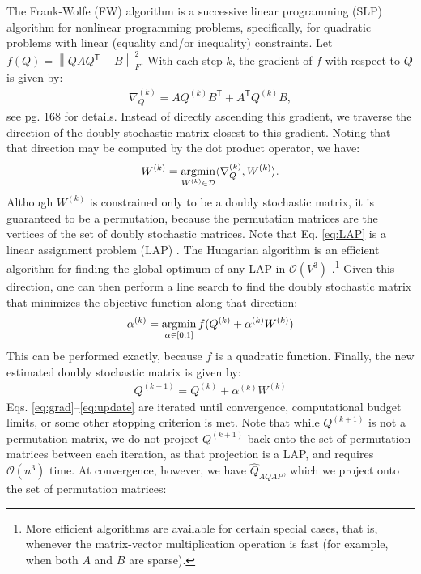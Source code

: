 \documentclass{article} %
\providecommand{\norm}[1]{\left \lVert#1 \right  \rVert}
\newcommand{\argmin}{\operatornamewithlimits{argmin}}
\newcommand{\T}{^{\ensuremath{\mathsf{T}}}}           %
\providecommand{\mc}[1]{\mathcal{#1}}
\providecommand{\mh}[1]{\hat{#1}}
\begin{document}
The Frank-Wolfe (FW) algorithm is a successive linear programming (SLP) \cite{} algorithm for nonlinear programming problems, specifically, for quadratic problems with linear (equality and/or inequality) constraints. Let $f(Q)=\norm{QAQ\T-B}_F^2$.  With each step $k$, the gradient of $f$ with respect to $Q$ is given by:
\begin{align} \label{eq:grad}
	\nabla_Q^{(k)} = A Q^{(k)} B\T + A\T Q^{(k)} B, 
\end{align}
see \cite{MDS} pg. 168 for details. Instead of directly ascending this gradient, we traverse the direction of the doubly stochastic matrix closest to this gradient. Noting that that direction may be computed by the dot product operator, we have:
\begin{align}\label{eq:LAP}
	W^{(k)} = \argmin_{W^{(k)} \in \mc{D}} \langle \nabla_Q^{(k)},W^{(k)} \rangle. %
\end{align}
Although $W^{(k)}$ is constrained only to be a doubly stochastic matrix, it is guaranteed to be a permutation, because the permutation matrices are the vertices of the set of doubly stochastic matrices.  Note that Eq. \eqref{eq:LAP} is a linear assignment problem (LAP) \cite{}.  The Hungarian algorithm is an efficient algorithm for finding the global optimum of any LAP in $\mc{O}(V^3)$ \cite{}.\footnote{More efficient algorithms are available for certain special cases, that is, whenever the matrix-vector multiplication operation is fast (for example, when both $A$ and $B$ are sparse).} Given this direction, one can then perform a line search to find the doubly stochastic matrix that minimizes the objective function along that direction:
\begin{align}
	\alpha^{(k)} = \argmin_{\alpha \in [0,1]} f(Q^{(k)} + \alpha^{(k)} W^{(k)})
\end{align}
This can be performed exactly, because $f$ is a quadratic function.  Finally, the new estimated doubly stochastic matrix is given by:
\begin{align}\label{eq:update}
	Q^{(k+1)} = Q^{(k)} + \alpha^{(k)} W^{(k)}
\end{align}
Eqs. \eqref{eq:grad}--\eqref{eq:update} are iterated until convergence, computational budget limits, or some other stopping criterion is met.  Note that while $Q^{(k+1)}$ is not a permutation matrix, we do not project $Q^{(k+1)}$ back onto the set of permutation matrices between each iteration, as that projection is a LAP, and requires $\mc{O}(n^3)$ time. At convergence, however, we have $\mh{Q}_{AQAP}$, which we project onto the set of permutation matrices:
\end{document}
